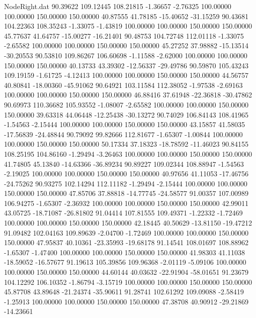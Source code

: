\begin{filecontents}{NodeRight.dat}
  90.39622  109.12445  108.21815    -1.36657   -2.76325  100.00000  100.00000  150.00000  150.00000   40.87555   41.78185  -15.40652  -31.15259
  90.43681  104.22363  108.35243    -1.33075   -1.43819  100.00000  100.00000  150.00000  150.00000   45.77637   41.64757  -15.00277  -16.21401
  90.48753  104.72748  112.01118    -1.33075   -2.65582  100.00000  100.00000  150.00000  150.00000   45.27252   37.98882  -15.13514  -30.20553
  90.53810  109.86267  106.60698    -1.11588   -2.62000  100.00000  100.00000  150.00000  150.00000   40.13733   43.39302  -12.56337  -29.49786
  90.59870  105.43243  109.19159    -1.61725   -4.12413  100.00000  100.00000  150.00000  150.00000   44.56757   40.80841  -18.00360  -45.91062
  90.64921  103.11584  112.38052    -1.97538   -2.69163  100.00000  100.00000  150.00000  150.00000   46.88416   37.61948  -22.36818  -30.47862
  90.69973  110.36682  105.93552    -1.08007   -2.65582  100.00000  100.00000  150.00000  150.00000   39.63318   44.06448  -12.25438  -30.13272
  90.74029  106.84143  108.41965    -1.54563   -2.15444  100.00000  100.00000  150.00000  150.00000   43.15857   41.58035  -17.56839  -24.48844
  90.79092   99.82666  112.81677    -1.65307   -1.00844  100.00000  100.00000  150.00000  150.00000   50.17334   37.18323  -18.78592  -11.46023
  90.84155  108.25195  104.86160    -1.29494   -3.26463  100.00000  100.00000  150.00000  150.00000   41.74805   45.13840  -14.63366  -36.89234
  90.89227  109.02344  108.88947    -1.54563   -2.19025  100.00000  100.00000  150.00000  150.00000   40.97656   41.11053  -17.46756  -24.75262
  90.93275  102.14294  112.11182    -1.29494   -2.15444  100.00000  100.00000  150.00000  150.00000   47.85706   37.88818  -14.77745  -24.58577
  91.00357  107.00989  106.94275    -1.65307   -2.36932  100.00000  100.00000  150.00000  150.00000   42.99011   43.05725  -18.71087  -26.81802
  91.04414  107.81555  109.49371    -1.22332   -1.72469  100.00000  100.00000  150.00000  150.00000   42.18445   40.50629  -13.81150  -19.47212
  91.09482  102.04163  109.89639    -2.04700   -1.72469  100.00000  100.00000  150.00000  150.00000   47.95837   40.10361  -23.35993  -19.68178
  91.14541  108.01697  108.88962    -1.65307   -1.47400  100.00000  100.00000  150.00000  150.00000   41.98303   41.11038  -18.59052  -16.57677
  91.19613  105.39856  109.96368    -2.01119   -5.09106  100.00000  100.00000  150.00000  150.00000   44.60144   40.03632  -22.91904  -58.01651
  91.23679  104.12292  106.10352    -1.86794   -3.15719  100.00000  100.00000  150.00000  150.00000   45.87708   43.89648  -21.24374  -35.90611
  91.28741  102.61292  109.09088    -2.58419   -1.25913  100.00000  100.00000  150.00000  150.00000   47.38708   40.90912  -29.21869  -14.23661

\end{filecontents}
